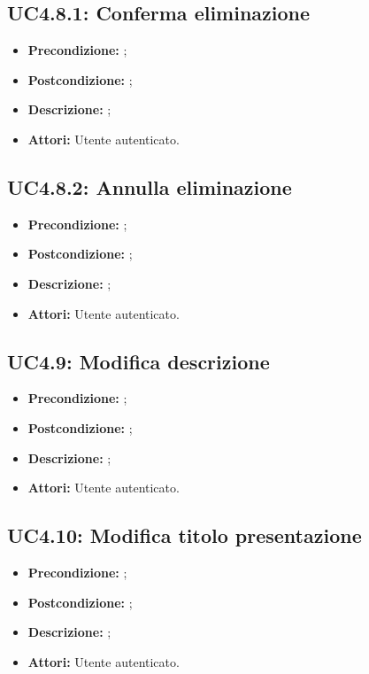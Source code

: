 \subsection{ UC4.8.1: Conferma eliminazione}

\begin{itemize}
	\item \textbf{Precondizione:} ;
	\item \textbf{Postcondizione:} ;
	\item \textbf{Descrizione:} ;
	\item \textbf{Attori:} Utente autenticato.
\end{itemize}
\subsection{ UC4.8.2: Annulla eliminazione}

\begin{itemize}
	\item \textbf{Precondizione:} ;
	\item \textbf{Postcondizione:} ;
	\item \textbf{Descrizione:} ;
	\item \textbf{Attori:} Utente autenticato.
\end{itemize}
\subsection{ UC4.9: Modifica descrizione}

\begin{itemize}
	\item \textbf{Precondizione:} ;
	\item \textbf{Postcondizione:} ;
	\item \textbf{Descrizione:} ;
	\item \textbf{Attori:} Utente autenticato.
\end{itemize}
\subsection{ UC4.10: Modifica titolo presentazione}

\begin{itemize}
	\item \textbf{Precondizione:} ;
	\item \textbf{Postcondizione:} ;
	\item \textbf{Descrizione:} ;
	\item \textbf{Attori:} Utente autenticato.
\end{itemize}
